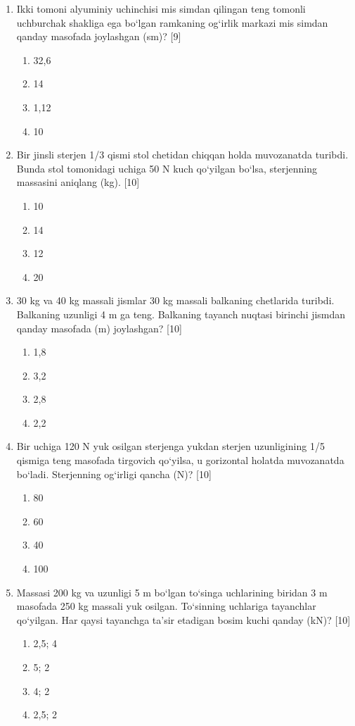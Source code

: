 \begin{enumerate}
\item Ikki tomoni alyuminiy uchinchisi mis simdan qilingan teng tomonli uchburchak shakliga ega bo‘lgan ramkaning og‘irlik markazi mis simdan qanday masofada joylashgan (sm)? [9]
\begin{enumerate}[label=\Alph*)]
\item 32,6
\item 14
\item 1,12
\item 10
\end{enumerate}

\item Bir jinsli sterjen 1/3 qismi stol chetidan chiqqan holda muvozanatda turibdi. Bunda stol tomonidagi uchiga 50 N kuch qo‘yilgan bo‘lsa, sterjenning massasini aniqlang (kg). [10]
\begin{enumerate}[label=\Alph*)]
\item 10
\item 14
\item 12
\item 20
\end{enumerate}

\item 30 kg va 40 kg massali jismlar 30 kg massali balkaning chetlarida turibdi. Balkaning uzunligi 4 m ga teng. Balkaning tayanch nuqtasi birinchi jismdan qanday masofada (m) joylashgan? [10]
\begin{enumerate}[label=\Alph*)]
\item 1,8
\item 3,2
\item 2,8
\item 2,2
\end{enumerate}

\item Bir uchiga 120 N yuk osilgan sterjenga yukdan sterjen uzunligining 1/5 qismiga teng masofada tirgovich qo‘yilsa, u gorizontal holatda muvozanatda bo‘ladi. Sterjenning og‘irligi qancha (N)? [10]
\begin{enumerate}[label=\Alph*)]
\item 80
\item 60
\item 40
\item 100
\end{enumerate}

\item Massasi 200 kg va uzunligi 5 m bo‘lgan to‘singa uchlarining biridan 3 m masofada 250 kg massali yuk osilgan. To‘sinning uchlariga tayanchlar qo‘yilgan. Har qaysi tayanchga ta’sir etadigan bosim kuchi qanday (kN)? [10]
\begin{enumerate}[label=\Alph*)]
\item 2,5; 4
\item 5; 2
\item 4; 2
\item 2,5; 2
\end{enumerate}


\end{enumerate}
